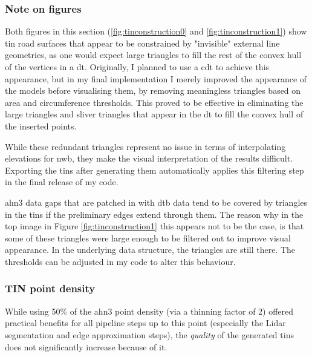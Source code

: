 \subsubsection{Note on figures}

Both figures in this section (\ref{fig:tinconstruction0} and \ref{fig:tinconstruction1}) show \ac{tin} road surfaces that appear to be constrained by "invisible" external line geometries, as one would expect large triangles to fill the rest of the convex hull of the vertices in a \ac{dt}. Originally, I planned to use a \ac{cdt} to achieve this appearance, but in my final implementation I merely improved the appearance of the models before visualising them, by removing meaningless triangles based on area and circumference thresholds. This proved to be effective in eliminating the large triangles and sliver triangles that appear in the \ac{dt} to fill the convex hull of the inserted points.

While these redundant triangles represent no issue in terms of interpolating elevations for \ac{nwb}, they make the visual interpretation of the results difficult. Exporting the \ac{tin}s after generating them automatically applies this filtering step in the final release of my code.

\ac{ahn3} data gaps that are patched in with \ac{dtb} data tend to be covered by triangles in the \ac{tin}s if the preliminary edges extend through them. The reason why in the top image in Figure \ref{fig:tinconstruction1} this appears not to be the case, is that some of these triangles were large enough to be filtered out to improve visual appearance. In the underlying data structure, the triangles are still there. The thresholds can be adjusted in my code to alter this behaviour.

\subsubsection{TIN point density}

While using 50\% of the \ac{ahn3} point density (via a thinning factor of 2) offered practical benefits for all pipeline steps up to this point (especially the Lidar segmentation and edge approximation steps), the \textit{quality} of the generated \ac{tin}s does not significantly increase because of it.

